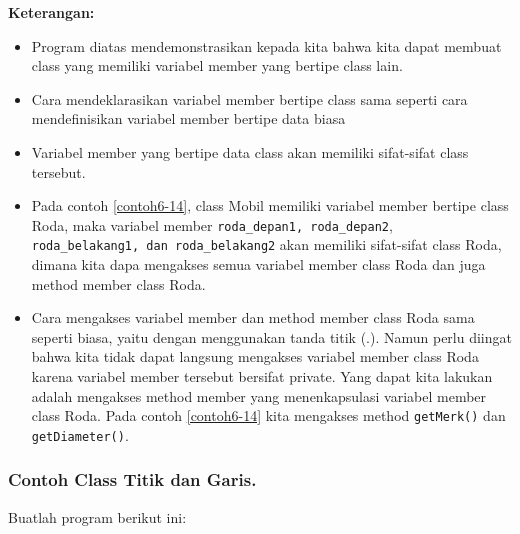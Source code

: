 \textbf{Keterangan:}

\begin{itemize}

\item
  Program diatas mendemonstrasikan kepada kita bahwa kita dapat membuat
  class yang memiliki variabel member yang bertipe class lain.
\item
  Cara mendeklarasikan variabel member bertipe class sama seperti cara
  mendefinisikan variabel member bertipe data biasa
\item
  Variabel member yang bertipe data class akan memiliki sifat-sifat
  class tersebut.
\item
  Pada contoh \ref{contoh6-14}, class Mobil memiliki variabel member
  bertipe class Roda, maka variabel member
  \texttt{roda\_depan1,\ roda\_depan2},
  \texttt{roda\_belakang1,\ dan\ roda\_belakang2} akan memiliki
  sifat-sifat class Roda, dimana kita dapa mengakses semua variabel
  member class Roda dan juga method member class Roda.
\item
  Cara mengakses variabel member dan method member class Roda sama
  seperti biasa, yaitu dengan menggunakan tanda titik (.). Namun perlu
  diingat bahwa kita tidak dapat langsung mengakses variabel member
  class Roda karena variabel member tersebut bersifat private. Yang
  dapat kita lakukan adalah mengakses method member yang menenkapsulasi
  variabel member class Roda. Pada contoh \ref{contoh6-14} kita mengakses method
  \texttt{getMerk()} dan \texttt{getDiameter()}.
\end{itemize}

\subsubsection*{Contoh  Class Titik dan Garis.}

Buatlah program berikut ini:

